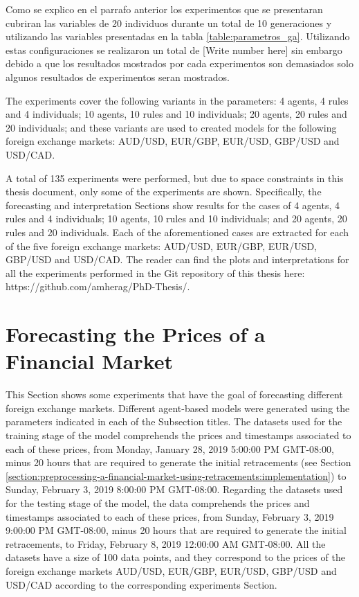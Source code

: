 Como se explico en el parrafo anterior los experimentos que se presentaran
cubriran las variables de 20 individuos durante un total de 10 generaciones y
utilizando las variables presentadas en la tabla \ref{table:parametros_ga}.
Utilizando estas configuraciones se realizaron un total de [Write number here]
sin embargo debido a que los resultados mostrados por cada experimentos son
demasiados solo algunos resultados de experimentos seran mostrados.



The experiments cover the following variants in the parameters: 4 agents, 4
rules and 4 individuals; 10 agents, 10 rules and 10 individuals; 20 agents, 20
rules and 20 individuals; and these variants are used to created models for the
following foreign exchange markets: AUD/USD, EUR/GBP, EUR/USD, GBP/USD and
USD/CAD.

A total of 135 experiments were performed, but due to space constraints in this
thesis document, only some of the experiments are shown. Specifically, the
forecasting and interpretation Sections show results for the cases of 4 agents,
4 rules and 4 individuals; 10 agents, 10 rules and 10 individuals; and 20
agents, 20 rules and 20 individuals. Each of the aforementioned cases are
extracted for each of the five foreign exchange markets: AUD/USD, EUR/GBP,
EUR/USD, GBP/USD and USD/CAD. The reader can find the plots and interpretations
for all the experiments performed in the Git repository of this thesis here:
https://github.com/amherag/PhD-Thesis/.

\section{Forecasting the Prices of a Financial Market}
\label{section:forecasting-the-prices-of-a-financial-market}

This Section shows some experiments that have the goal of forecasting different
foreign exchange markets. Different agent-based models were generated using the
parameters indicated in each of the Subsection titles. The datasets used for the
training stage of the model comprehends the prices and timestamps associated to
each of these prices, from Monday, January 28, 2019 5:00:00 PM GMT-08:00, minus
20 hours that are required to generate the initial retracements (see Section
\ref{section:preprocessing-a-financial-market-using-retracements:implementation})
to Sunday, February 3, 2019 8:00:00 PM GMT-08:00. Regarding the datasets used
for the testing stage of the model, the data comprehends the prices and
timestamps associated to each of these prices, from Sunday, February 3, 2019
9:00:00 PM GMT-08:00, minus 20 hours that are required to generate the initial
retracements, to Friday, February 8, 2019 12:00:00 AM GMT-08:00. All the
datasets have a size of 100 data points, and they correspond to the prices of
the foreign exchange markets AUD/USD, EUR/GBP, EUR/USD, GBP/USD and USD/CAD
according to the corresponding experiments Section.

